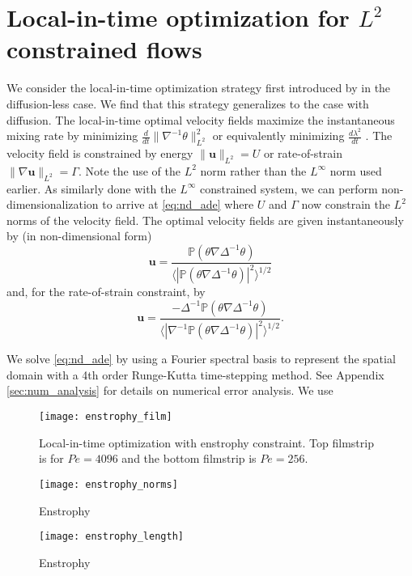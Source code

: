 \documentclass{jfm}
\newcommand{\ddt}[1]{\frac{d #1}{dt}}
\newcommand{\hmone}[1]{\|\nabla^{-1} #1\|_{L^{2}}}
\newcommand{\ltwo}[1]{\|#1\|_{L^{2}}}
\renewcommand{\u}{\mathbf{u}}
\newcommand{\invlap}{\Delta^{-1}}
\begin{document}
\section{Local-in-time optimization for $L^{2}$ constrained flows}

We consider the local-in-time optimization strategy first introduced by \cite{JFM2011} in the diffusion-less case. We find that this strategy generalizes to the case with diffusion. The local-in-time optimal velocity fields maximize the instantaneous mixing rate by minimizing $\ddt{}\hmone{\theta}^2$ or equivalently minimizing $\ddt{\lambda^2}$ . The velocity field is constrained by energy $\ltwo{\u} = U$ or rate-of-strain $\ltwo{\nabla\u} = \Gamma.$ Note the use of the $L^2$ norm rather than the $L^{\infty}$ norm used earlier.  As similarly done with the $L^{\infty}$ constrained system, we can perform non-dimensionalization to arrive at \eqref{eq:nd_ade} where $U$ and $\Gamma$ now constrain the $L^{2}$ norms of the velocity field. The optimal velocity fields are given instantaneously by (in non-dimensional form)
\begin{equation}
\mathbf{u}= \frac{\mathds{P}(\theta \nabla \invlap\theta)}{\langle |\mathds{P}(\theta \nabla \invlap\theta)|^2\rangle^{1/2}}
\end{equation} 
and,  for the rate-of-strain constraint, by 
\begin{equation}
\mathbf{u}= \frac{-\invlap\mathds{P}(\theta \nabla \invlap\theta)}{\langle |\nabla^{-1}\mathds{P}(\theta \nabla \invlap\theta)|^2\rangle^{1/2}}.
\end{equation}  	

We solve \eqref{eq:nd_ade} by using a Fourier spectral basis to represent the spatial domain with a 4th order Runge-Kutta time-stepping method. See Appendix \ref{sec:num_analysis} for details on numerical error analysis. We use 


\begin{figure}
\texttt{[image: enstrophy\_film]}
\caption{Local-in-time optimization with enstrophy constraint. Top filmstrip is for $Pe = 4096$ and the bottom filmstrip is $Pe=256$.}
\end{figure}

\begin{figure}
\texttt{[image: enstrophy\_norms]}
\caption{Enstrophy}
\end{figure}

\begin{figure}
\texttt{[image: enstrophy\_length]}
\caption{Enstrophy}
\end{figure}
\end{document}

